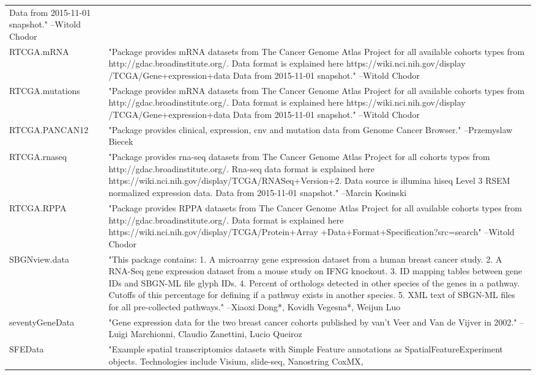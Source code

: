 \documentclass[]{article}
\begin{document}
\begin{longtable}[t]{l>{\raggedright\arraybackslash}p{25em}}
Data from 2015-11-01 snapshot." --Witold \vphantom{1} Chodor\\
RTCGA.mRNA & "Package provides mRNA datasets from The Cancer Genome
Atlas Project for all available cohorts types from
http://gdac.broadinstitute.org/. Data format is explained here
https://wiki.nci.nih.gov/display /TCGA/Gene+expression+data Data
from 2015-11-01 snapshot." --Witold Chodor\\
RTCGA.mutations & "Package provides mRNA datasets from The Cancer Genome
Atlas Project for all available cohorts types from
http://gdac.broadinstitute.org/. Data format is explained here
https://wiki.nci.nih.gov/display /TCGA/Gene+expression+data Data
from 2015-11-01 snapshot." --Witold Chodor\\
RTCGA.PANCAN12 & "Package provides clinical, expression, cnv and mutation
data from Genome Cancer Browser." --Przemyslaw Biecek\\
\addlinespace
RTCGA.rnaseq & "Package provides rna-seq datasets from The Cancer Genome
Atlas Project for all cohorts types from
http://gdac.broadinstitute.org/. Rna-seq data format is
explained here
https://wiki.nci.nih.gov/display/TCGA/RNASeq+Version+2. Data
source is illumina hiseq Level 3 RSEM normalized expression
data. Data from 2015-11-01 snapshot." --Marcin Kosinski\\
RTCGA.RPPA & "Package provides RPPA datasets from The Cancer Genome
Atlas Project for all available cohorts types from
http://gdac.broadinstitute.org/. Data format is explained here
https://wiki.nci.nih.gov/display/TCGA/Protein+Array
+Data+Format+Specification?src=search" --Witold Chodor\\
SBGNview.data & "This package contains: 1. A microarray gene expression
dataset from a human breast cancer study. 2. A RNA-Seq gene
expression dataset from a mouse study on IFNG knockout. 3. ID
mapping tables between gene IDs and SBGN-ML file glyph IDs. 4.
Percent of orthologs detected in other species of the genes in
a pathway. Cutoffs of this percentage for defining if a pathway
exists in another species. 5. XML text of SBGN-ML files for all
pre-collected pathways." --Xiaoxi Dong*, Kovidh Vegesna*, Weijun Luo\\
seventyGeneData & "Gene expression data for the two breast cancer cohorts
published by van't Veer and Van de Vijver in 2002." --Luigi Marchionni, Claudio Zanettini, Lucio Queiroz\\
SFEData & "Example spatial transcriptomics datasets with Simple
Feature annotations as SpatialFeatureExperiment objects.
Technologies include Visium, slide-seq, Nanostring CoxMX,

\end{longtable}
\end{document}
